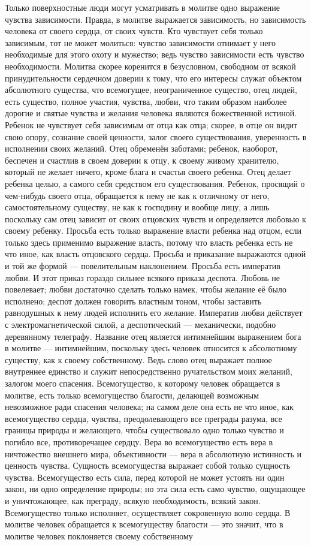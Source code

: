 \documentclass[12pt,oneside]{book}
\begin{document}
Только поверхностные люди могут усматривать в молитве одно выражение чувства зависимости. Правда, в молитве выражается зависимость, но зависимость человека от своего сердца, от своих чувств. Кто чувствует себя только зависимым, тот не может молиться: чувство зависимости отнимает у него необходимые для этого охоту и мужество; ведь чувство зависимости есть чувство необходимости. Молитва скорее коренится в безусловном, свободном от всякой принудительности сердечном доверии к тому, что его интересы служат объектом абсолютного существа, что всемогущее, неограниченное существо, отец людей, есть существо, полное участия, чувства, любви, что таким образом наиболее дорогие и святые чувства и желания человека являются божественной истиной. Ребенок не чувствует себя зависимым от отца как отца; скорее, в отце он видит свою опору, сознание своей ценности, залог своего существования, уверенность в исполнении своих желаний. Отец обременён заботами; ребенок, наоборот, беспечен и счастлив в своем доверии к отцу, к своему живому хранителю, который не желает ничего, кроме блага и счастья своего ребенка. Отец делает ребенка целью, а самого себя средством его существования. Ребенок, просящий о чем-нибудь своего отца, обращается к нему не как к отличному от него, самостоятельному существу, не как к господину и вообще лицу, а лишь поскольку сам отец зависит от своих отцовских чувств и определяется любовью к своему ребенку. Просьба есть только выражение власти ребенка над отцом, если только здесь применимо выражение власть, потому что власть ребенка есть не что иное, как власть отцовского сердца. Просьба и приказание выражаются одной и той же формой --- повелительным наклонением. Просьба есть императив любви. И этот приказ гораздо сильнее всякого приказа деспота. Любовь не повелевает; любви достаточно сделать только намек, чтобы желание её было исполнено; деспот должен говорить властным тоном, чтобы заставить равнодушных к нему людей исполнить его желание. Императив любви действует с электромагнетической силой, а деспотический --- механически, подобно деревянному телеграфу. Название отец является интимнейшим выражением бога в молитве --- интимнейшим, поскольку здесь человек относится к абсолютному существу, как к своему собственному. Ведь слово отец выражает полное внутреннее единство и служит непосредственно ручательством моих желаний, залогом моего спасения. Всемогущество, к которому человек обращается в молитве, есть только всемогущество благости, делающей возможным невозможное ради спасения человека; на самом деле она есть не что иное, как всемогущество сердца, чувства, преодолевающего все преграды разума, все границы природы и желающего, чтобы существовало одно только чувство и погибло все, противоречащее сердцу. Вера во всемогущество есть вера в ничтожество внешнего мира, объективности --- вера в абсолютную истинность и ценность чувства. Сущность всемогущества выражает собой только сущность чувства. Всемогущество есть сила, перед которой не может устоять ни один закон, ни одно определение природы; но эта сила есть само чувство, ощущающее и уничтожающее, как преграду, всякую необходимость, всякий закон. Всемогущество только исполняет, осуществляет сокровенную волю сердца. В молитве человек обращается к всемогуществу благости --- это значит, что в молитве человек поклоняется своему собственному 
\end{document}
